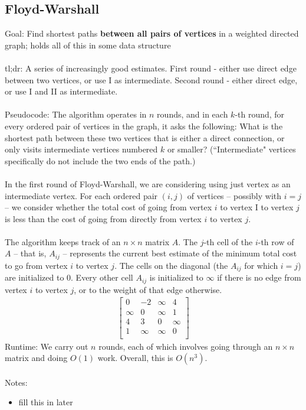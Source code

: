 \documentclass[12pt]{article}
\begin{document}
\subsection*{Floyd-Warshall}
Goal: Find shortest paths \textbf{between all pairs of vertices} in a weighted directed graph; holds all of this in some data structure
\\\\
tl;dr: A series of increasingly good estimates. First round - either use direct edge between two vertices, or use I as intermediate. Second round - either direct edge, or use I and II as intermediate.
\\\\
Pseudocode: The algorithm operates in $n$ rounds, and in each $k$-th round, for every ordered pair of vertices in the graph, it asks the following: What is the shortest path between these two vertices that is either a direct connection, or only visits intermediate vertices numbered $k$ or smaller? (``Intermediate" vertices specifically do not include the two ends of the path.) 
\\\\
In the first round of Floyd-Warshall, we are considering using just vertex as an intermediate vertex. For each ordered pair $(i, j)$ of vertices -- possibly with $i = j$ -- we consider whether the total cost of going from vertex $i$ to vertex I to vertex $j$ is less than the cost of going from directly from vertex $i$ to vertex $j$.
\\\\
The algorithm keeps track of an $n \times n$ matrix $A$. The $j$-th cell of the $i$-th row of $A$ -- that is, $A_{ij}$ -- represents the current best estimate of the minimum total cost to go from vertex $i$ to vertex $j$. The cells on the diagonal (the $A_{ij}$ for which $i = j$) are initialized to $0$. Every other cell $A_{ij}$ is initialized to $\infty$ if there is no edge from vertex $i$ to vertex $j$, or to the weight of that edge otherwise.
\begin{align*}
    \begin{bmatrix}
    0 & -2 & \infty & 4\\
    \infty & 0 & \infty & 1\\
    4 & 3 & 0 & \infty\\
    1 & \infty & \infty & 0\\
    \end{bmatrix}
\end{align*}
Runtime: We carry out $n$ rounds, each of which involves going through an $n \times n$ matrix and doing $O(1)$ work. Overall, this is $O(n^3)$.
\\\\
Notes:
\begin{itemize}
    \item fill this in later
\end{itemize}
\end{document}
